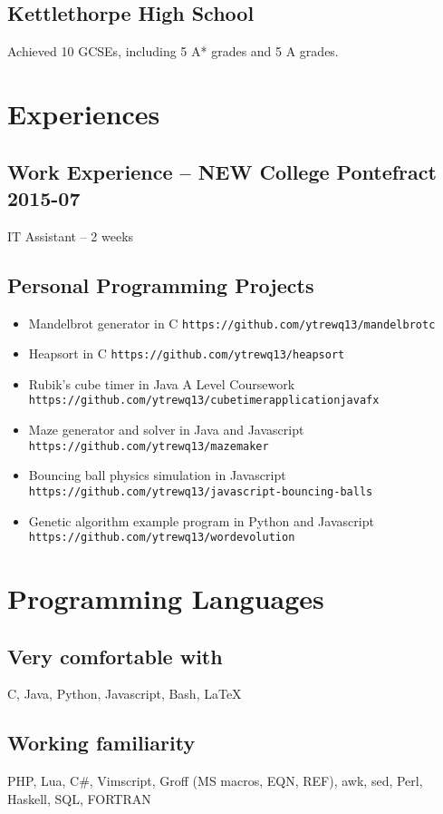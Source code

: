 \documentclass[10pt]{extarticle}
\begin{document}
      \subsection{Kettlethorpe High School}
    Achieved 10 GCSEs, including 5 A* grades and 5 A grades.
    \section{Experiences}
    \subsection{Work Experience -- NEW College Pontefract
    \hfill 2015-07}
    IT Assistant
    --
    2 weeks
    \subsection{Personal Programming Projects}
    \begin{itemize}
        \item Mandelbrot generator in C
            \hfill
            \texttt{https://github.com/ytrewq13/mandelbrotc}
        \item Heapsort in C
            \hfill
            \texttt{https://github.com/ytrewq13/heapsort}
        \item Rubik's cube timer in Java
            \hfill
            A Level Coursework
            \hfill
            \texttt{https://github.com/ytrewq13/cubetimerapplicationjavafx}
        \item Maze generator and solver in Java and Javascript
            \hfill
            \texttt{https://github.com/ytrewq13/mazemaker}
        \item Bouncing ball physics simulation in Javascript
            \hfill
            \texttt{https://github.com/ytrewq13/javascript-bouncing-balls}
        \item Genetic algorithm example program in Python and Javascript
            \hfill
            \texttt{https://github.com/ytrewq13/wordevolution}
    \end{itemize}
    \section{Programming Languages}
    \subsection{Very comfortable with}
    C, Java, Python, Javascript, Bash, \LaTeX
    \subsection{Working familiarity}
    PHP, Lua, C\#, Vimscript, Groff (MS macros, EQN, REF), awk, sed, Perl, Haskell, SQL, FORTRAN
\end{document}
